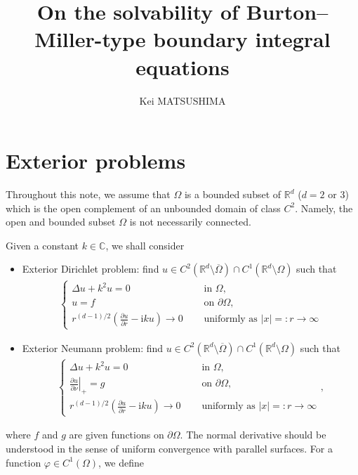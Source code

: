 \documentclass{article}
\title{On the solvability of Burton--Miller-type boundary integral equations}
\author{Kei MATSUSHIMA}
\theoremstyle{plain}
\theoremstyle{definition}
\begin{document}
\maketitle

\section{Exterior problems}
Throughout this note, we assume that $\Omega$ is a bounded subset of $\mathbb R^d$ ($d=2$ or $3$) which is the open complement of an unbounded domain of class $C^2$. Namely, the open and bounded subset $\Omega$ is not necessarily connected.

Given a constant $k\in\mathbb C$, we shall consider
\begin{itemize}
    \item Exterior Dirichlet problem: find $u\in C^2(\mathbb R^d\setminus\overline\Omega) \cap C^1(\mathbb R^d\setminus\Omega)$ such that
    \begin{align}\label{eq:dirichlet}
        \begin{cases}
            \varDelta u + k^2 u = 0 \quad &\text{ in } \Omega,\\
            u = f \quad &\text{ on } \partial \Omega,
            \\
            \displaystyle r^{(d-1)/2}\left( \frac{\partial u}{\partial r} - \mathrm iku\right) \to 0  \quad &\text{ uniformly as } |x|=:r\to\infty
        \end{cases}
    \end{align}
    \item Exterior Neumann problem: find $u\in C^2(\mathbb R^d\setminus\overline\Omega) \cap C^1(\mathbb R^d\setminus\Omega)$ such that
    \begin{align}\label{eq:neumann}
        \begin{cases}
            \varDelta u + k^2 u = 0 \quad &\text{ in } \Omega,\\
            \displaystyle \left. \frac{\partial u}{\partial \nu}\right|_+ = g \quad &\text{ on } \partial \Omega,
            \\
            \displaystyle r^{(d-1)/2}\left( \frac{\partial u}{\partial r} - \mathrm iku\right) \to 0  \quad &\text{ uniformly as } |x|=:r\to\infty
        \end{cases}
        ,
    \end{align}
\end{itemize}
where $f$ and $g$ are given functions on $\partial\Omega$. The normal derivative should be understood in the sense of uniform convergence with parallel surfaces. For a function $\varphi\in C^1(\Omega)$, we define
\end{document}
